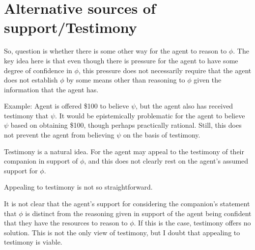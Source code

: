 \documentclass[10pt]{article}
\begin{document}





\section{Alternative sources of support/Testimony}
\label{sec:altern-sourc-supp}

So, question is whether there is some other way for the agent to reason to \(\phi\).
The key idea here is that even though there is pressure for the agent to have some degree of confidence in \(\phi\), this pressure does not necessarily require that the agent does not establish \(\phi\) by some means other than reasoning to \(\phi\) given the information that the agent has.

Example: Agent is offered \$100 to believe \(\psi\), but the agent also has received testimony that \(\psi\).
It would be epistemically problematic for the agent to believe \(\psi\) based on obtaining \$100, though perhaps practically rational.
Still, this does not prevent the agent from believing \(\psi\) on the basis of testimony.

Testimony is a natural idea.
For the agent may appeal to the testimony of their companion in support of \(\phi\), and this does not clearly rest on the agent's assumed support for \(\phi\).

Appealing to testimony is not so straightforward.

It is not clear that the agent's support for considering the companion's statement that \(\phi\) is distinct from the reasoning given in support of the agent being confident that they have the resources to reason to \(\phi\).
If this is the case, testimony offers no solution.
This is not the only view of testimony, but I doubt that appealing to testimony is viable.
\end{document}
